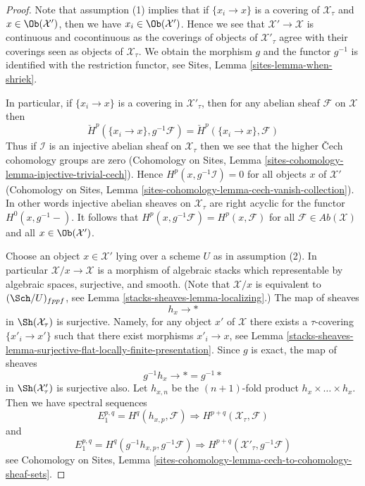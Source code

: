 \begin{proof}
Note that assumption (1) implies that if $\{x_i \to x\}$ is a covering
of $\mathcal{X}_\tau$ and $x \in \Ob(\mathcal{X}')$, then we have
$x_i \in \Ob(\mathcal{X}')$. Hence we see that $\mathcal{X}' \to \mathcal{X}$
is continuous and cocontinuous as the coverings of objects of
$\mathcal{X}'_\tau$ agree with their coverings seen as objects of
$\mathcal{X}_\tau$. We obtain the morphism $g$ and the functor
$g^{-1}$ is identified with the restriction functor, see
Sites, Lemma \ref{sites-lemma-when-shriek}.

\medskip\noindent
In particular, if $\{x_i \to x\}$ is a covering in $\mathcal{X}'_\tau$,
then for any abelian sheaf $\mathcal{F}$ on $\mathcal{X}$ then
$$
\check H^p(\{x_i \to x\}, g^{-1}\mathcal{F}) =
\check H^p(\{x_i \to x\}, \mathcal{F})
$$
Thus if $\mathcal{I}$ is an injective abelian sheaf on $\mathcal{X}_\tau$
then we see that the higher {\v C}ech cohomology groups are zero
(Cohomology on Sites,
Lemma \ref{sites-cohomology-lemma-injective-trivial-cech}).
Hence $H^p(x, g^{-1}\mathcal{I}) = 0$ for all objects $x$
of $\mathcal{X}'$
(Cohomology on Sites,
Lemma \ref{sites-cohomology-lemma-cech-vanish-collection}).
In other words injective abelian sheaves on $\mathcal{X}_\tau$
are right acyclic for the functor $H^0(x, g^{-1}-)$.
It follows that $H^p(x, g^{-1}\mathcal{F}) = H^p(x, \mathcal{F})$
for all $\mathcal{F} \in \textit{Ab}(\mathcal{X})$ and all
$x \in \Ob(\mathcal{X}')$.

\medskip\noindent
Choose an object $x \in \mathcal{X}'$ lying over a scheme $U$
as in assumption (2). In particular $\mathcal{X}/x \to \mathcal{X}$
is a morphism of algebraic stacks which representable by algebraic spaces,
surjective, and smooth. (Note that $\mathcal{X}/x$ is equivalent to
$(\Sch/U)_{fppf}$, see Lemma \ref{stacks-sheaves-lemma-localizing}.)
The map of sheaves
$$
h_x \longrightarrow *
$$
in $\Sh(\mathcal{X}_\tau)$ is surjective. Namely, for any object $x'$
of $\mathcal{X}$ there exists a $\tau$-covering $\{x'_i \to x'\}$
such that there exist morphisms $x'_i \to x$, see
Lemma \ref{stacks-sheaves-lemma-surjective-flat-locally-finite-presentation}.
Since $g$ is exact, the map of sheaves
$$
g^{-1}h_x \longrightarrow * = g^{-1}*
$$
in $\Sh(\mathcal{X}'_\tau)$ is surjective also. Let $h_{x, n}$ be
the $(n + 1)$-fold product $h_x \times \ldots \times h_x$.
Then we have spectral sequences
\begin{equation}
\label{equation-spectral-sequence-one}
E_1^{p, q} = H^q(h_{x, p}, \mathcal{F}) \Rightarrow
H^{p + q}(\mathcal{X}_\tau, \mathcal{F})
\end{equation}
and
\begin{equation}
\label{equation-spectral-sequence-two}
E_1^{p, q} = H^q(g^{-1}h_{x, p}, g^{-1}\mathcal{F}) \Rightarrow
H^{p + q}(\mathcal{X}'_\tau, g^{-1}\mathcal{F})
\end{equation}
see Cohomology on Sites,
Lemma \ref{sites-cohomology-lemma-cech-to-cohomology-sheaf-sets}.


\end{proof}
